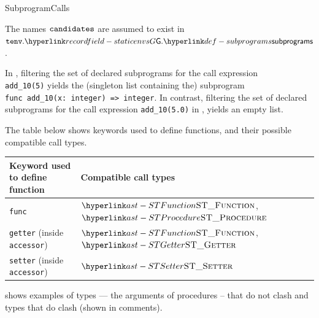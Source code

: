 \begin{TypingRuleList}{SubprogramCalls}


The names $\texttt{candidates}$ are assumed to exist in $\tenv.\staticenvsG.\subprograms$.

In , filtering the
set of declared subprograms for the call expression\\ \verb|add_10(5)| yields
the (singleton list containing the) subprogram \\
\verb|func add_10(x: integer) => integer|.
In contrast, filtering the set of declared subprograms for the call expression
\verb|add_10(5.0)| in ,
yields an empty list.




The table below shows keywords used to define functions, and their possible compatible call types.

\begin{center}
\begin{tabular}{ll}
\textbf{Keyword used to define function} & \textbf{Compatible call types} \\
\hline
\verb|func|                            & $\STFunction$, $\STProcedure$ \\
\verb|getter| (inside \verb|accessor|) & $\STFunction$, $\STGetter$    \\
\verb|setter| (inside \verb|accessor|) & $\STSetter$                   \\
\end{tabular}
\end{center}





 shows examples of types ---
the arguments of procedures -- that do not clash and types that do clash
(shown in comments).



\end{TypingRuleList}
